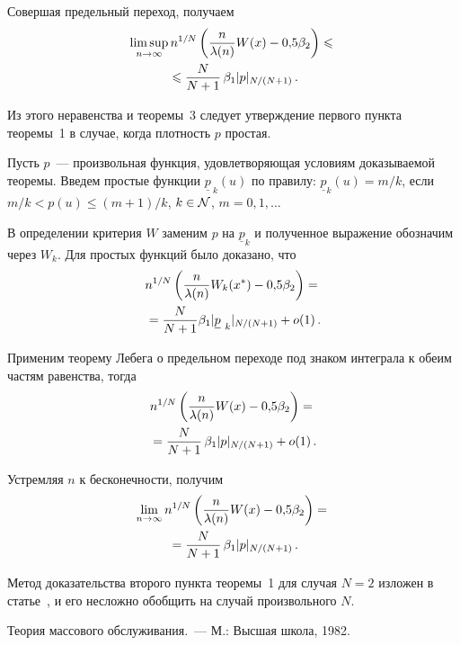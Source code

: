 \begin{multicols}{2}
Совершая предельный переход, получаем
\begin{multline*}
\limsup\limits_{n\rightarrow
\infty}n^{1/N}\left(\displaystyle\frac{\displaystyle n\mathstrut}{\displaystyle \lambda(n)\mathstrut}W(x)-0{,}5\beta_2\right)\leqslant{}\\
{}\leqslant
\displaystyle\frac{\displaystyle N\mathstrut}{\displaystyle N+1\mathstrut}\, \beta_1 |p|_{N/(N+1)}\,.
\end{multline*}

Из этого неравенства и теоремы~3 следует утверждение первого пункта теоремы~1 в случае,
когда плотность $p$ простая.

Пусть $p$~--- произвольная функция, удовлетворяющая условиям доказываемой теоремы. Введем
простые функции $\underline{p}_{~k}(u)$ по правилу:
$\underline{p}_{k}(u)=m/k$, если $m/k<p(u)\leqslant (m+1)/k$, $k\in {\cal N}$,
$m=0,1,\ldots$

В определении критерия $W$ заменим $p$ на $\underline{p}_{k}$ и полученное выражение
обозначим через $W_k$. Для простых функций было доказано, что
\begin{multline*}
n^{1/N}\left(\displaystyle\frac{\displaystyle n\mathstrut}{\displaystyle \lambda(n)\mathstrut}W_k(x^*)-0{,}5\beta_2\right)={}\\
{}=
\displaystyle\frac{\displaystyle N\mathstrut}{\displaystyle N+1\mathstrut} \beta_1 |\underline{p}_{~k}|_{N/(N+1)} + o(1)\,.
\end{multline*}

Применим теорему Лебега о предельном переходе под знаком интеграла к обеим частям равенства,
тогда
\begin{multline*}
n^{1/N}\left(\displaystyle\frac{\displaystyle n\mathstrut}{\displaystyle \lambda(n)\mathstrut}W(x)-0{,}5\beta_2\right) ={}\\
{}=
\displaystyle\frac{\displaystyle N\mathstrut}{\displaystyle N+1\mathstrut}\, \beta_1 |p|_{N/(N+1)}+o(1)\,.
\end{multline*}

Устремляя $n$ к бесконечности, получим
\begin{multline*}
\lim\limits_{n\rightarrow
\infty}n^{1/N}\left(\displaystyle\frac{\displaystyle n\mathstrut}{\displaystyle \lambda(n)\mathstrut}W(x)-0{,}5\beta_2\right) ={}\\
{}=
\displaystyle\frac{\displaystyle N\mathstrut}{\displaystyle N+1\mathstrut}\,\beta_1 |p|_{N/(N+1)}\,.
\end{multline*}

\smallskip
Метод доказательства второго пункта теоремы~1 для случая $N=2$
изложен в статье~\cite{3za}, и его
несложно обобщить на случай произвольного $N$.


{\small\frenchspacing
{%
\begin{thebibliography}{9}

Теория массового обслуживания.~--- М.: Высшая школа, 1982.


\end{thebibliography}}}
\end{multicols}
